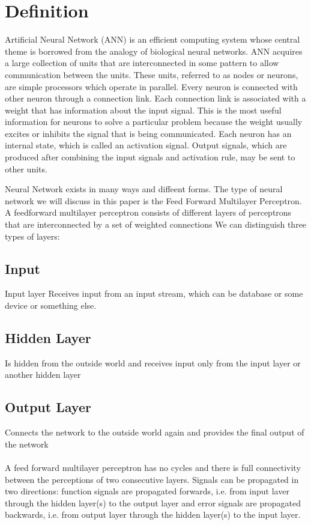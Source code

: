 \documentclass{report}
\begin{document}
\section{Definition}
Artificial Neural Network (ANN) is an efficient computing system whose central theme is borrowed from the analogy of biological neural networks. ANN acquires a large collection of units that are interconnected in some pattern to allow communication between the units. These units, referred to as nodes or neurons, are simple processors which operate in parallel.
Every neuron is connected with other neuron through a connection link. Each connection link is associated with a weight that has information about the input signal. This is the most useful information for neurons to solve a particular problem because the weight usually excites or inhibits the signal that is being communicated. Each neuron has an internal state, which is called an activation signal. Output signals, which are produced after combining the input signals and activation rule, may be sent to other units.



Neural Network exists in many ways and diffeent forms. The type of neural network we will discuss in this paper is the Feed Forward Multilayer Perceptron. A feedforward multilayer perceptron consists of different layers of perceptrons that are interconnected by a set of weighted connections We can distinguish three types of layers:

\subsection{Input}
Input layer Receives input from an input stream, which can be database or some device or something else.

\subsection{Hidden Layer}
Is hidden from the outside world and receives input only from the input layer or another hidden layer

\subsection{Output Layer}
Connects the network to the outside world again and provides the final output of the network
\paragraph{}
A feed forward multilayer perceptron has no cycles and there is full connectivity between the perceptions of two consecutive layers. Signals can be propagated in two directions: function signals are propagated forwards, i.e. from input laver through the hidden layer(s) to the output layer and error signals are propagated backwards, i.e. from output layer through the hidden layer(s) to the input layer.
\end{document}
